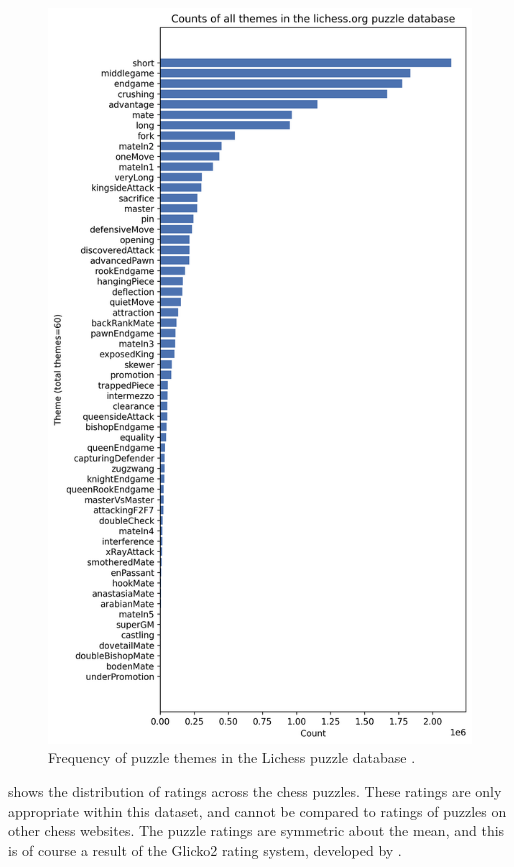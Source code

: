 \begin{figure}
  \centering
  \includegraphics[width=0.9\linewidth]{project/img/puzzle_theme_counts.png}
  \caption{Frequency of puzzle themes in the Lichess puzzle database
  \citep{lichessPuzzles}.}
  \label{dataThemeCounts}
\end{figure}

 shows the distribution of ratings across the chess
puzzles. These ratings are only appropriate within this dataset, and cannot be
compared to ratings of puzzles on other chess websites. The puzzle ratings are
symmetric about the mean, and this is of course a result of the Glicko2 rating
system, developed by \citet{glicko}.

